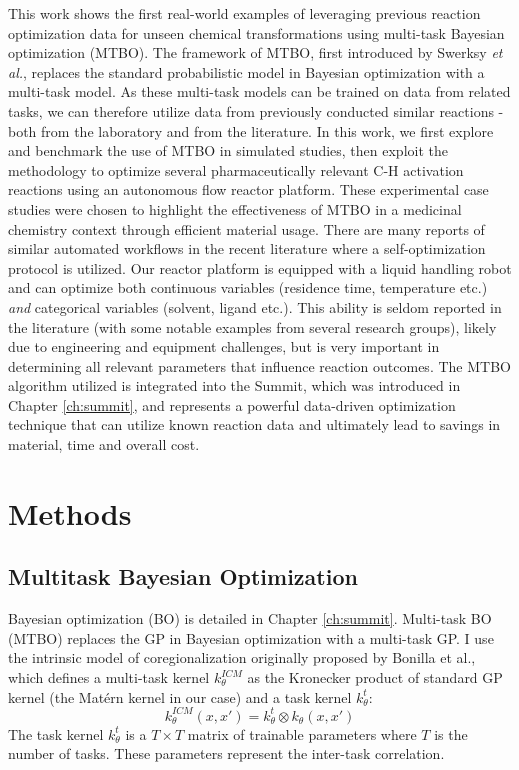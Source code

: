 This work shows the first real-world examples of leveraging previous reaction optimization data for unseen chemical transformations using multi-task Bayesian optimization (MTBO). The framework of MTBO, first introduced by Swerksy \textit{et al.},\cite{Swersky2013} replaces the standard probabilistic model in Bayesian optimization with a multi-task model. As these multi-task models can be trained on data from related tasks, we can therefore utilize data from previously conducted similar reactions - both from the laboratory and from the literature. In this work, we first explore and benchmark the use of MTBO in simulated studies, then exploit the methodology to optimize several pharmaceutically relevant C-H activation reactions using an autonomous flow reactor platform. These experimental case studies were chosen to highlight the effectiveness of MTBO in a medicinal chemistry context through efficient material usage. There are many reports of similar automated workflows in the recent literature where a self-optimization protocol is utilized.\cite{Sans2015, Mateos2019} Our reactor platform is equipped with a liquid handling robot and can optimize both continuous variables (residence time, temperature etc.) \textit{and} categorical variables (solvent, ligand etc.). This ability is seldom reported in the literature (with some notable examples from several research groups),\cite{Reizman2016a, Kershaw2023} likely due to engineering and equipment challenges, but is very important in determining all relevant parameters that influence reaction outcomes. The MTBO algorithm utilized is integrated into the Summit, which was introduced in Chapter \ref{ch:summit}, and represents a powerful data-driven optimization technique that can utilize known reaction data and ultimately lead to savings in material, time and overall cost.


\section{Methods}


\subsection{Multitask Bayesian Optimization}

Bayesian optimization (BO) is detailed in Chapter \ref{ch:summit}. Multi-task BO (MTBO) replaces the GP in Bayesian optimization with a multi-task GP. I use the intrinsic model of coregionalization originally proposed by Bonilla et al.,\cite{Bonilla2007} which defines a multi-task kernel $k^{ICM}_{\theta}$ as the Kronecker product of standard GP kernel (the Matérn kernel in our case) and a task kernel $k^t_{\theta}$:
\begin{equation}
    k^{ICM}_{\theta}(x,x') = k^t_{\theta} \otimes  k_{\theta}(x,x')
\end{equation}
The task kernel $k^t_{\theta}$ is a $T \times T$ matrix of trainable parameters where $T$ is the number of tasks. These parameters represent the inter-task correlation.

